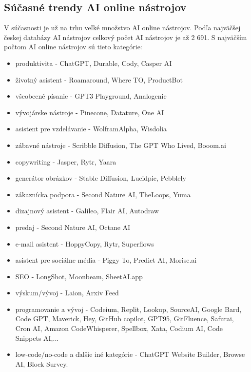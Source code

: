
\subsection{Súčasné trendy AI online nástrojov}

V súčasnosti je už na trhu veľké množstvo AI online nástrojov. Podľa najväčšej českej databázy AI nástrojov celkový počet AI nástrojov je až 2 691. \cite{ejaj} S najväčším počtom AI online nástrojov sú tieto kategórie:
\begin{itemize}
    \item produktivita - ChatGPT, Durable, Cody, Casper AI
    \item životný asistent - Roamaround, Where TO, ProductBot
    \item všeobecné písanie - GPT3 Playground, Analogenie
    \item vývojárske nástroje - Pinecone, Datature, One AI
    \item asistent pre vzdelávanie - WolframAlpha, Wisdolia
    \item zábavné nástroje - Scribble Diffusion, The GPT Who Lived, Booom.ai
    \item copywriting - Jasper, Rytr, Yaara
    \item generátor obrázkov - Stable Diffusion, Lucidpic, Pebblely
    \item zákaznícka podpora - Second Nature AI, TheLoops, Yuma
    \item dizajnový asistent - Galileo, Flair AI, Autodraw
    \item predaj - Second Nature AI, Octane AI
    \item e-mail asistent - HoppyCopy, Rytr, Superflows
    \item asistent pre sociálne média - Piggy To, Predict AI, Morise.ai
    \item SEO - LongShot, Moonbeam, SheetAI.app
    \item výskum/vývoj - Laion, Arxiv Feed
    \item programovanie a vývoj - Codeium, Replit, Lookup, SourceAI, Google Bard, Code GPT, Maverick, Hey, GitHub copilot, GPT95, GitFluence, Safurai, Cron AI, Amazon CodeWhisperer, Spellbox, Xata, Codium AI, Code Snippets AI,...
    \item low-code/no-code a ďalšie iné kategórie - ChatGPT Website Builder, Browse AI, Block Survey.
\end{itemize}

